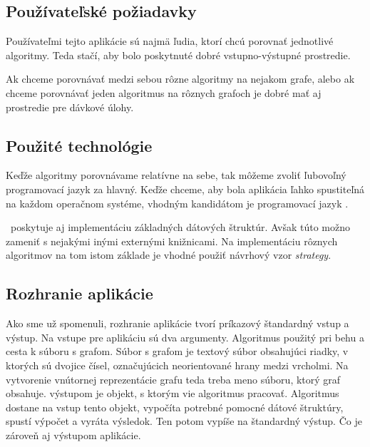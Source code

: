 
\subsection{Používateľské požiadavky}

Používateľmi tejto aplikácie sú najmä ľudia, ktorí chcú porovnať jednotlivé 
algoritmy. Teda stačí, aby bolo poskytnuté dobré vstupno-výstupné prostredie.

Ak chceme porovnávať medzi sebou rôzne algoritmy na nejakom grafe, alebo ak 
chceme porovnávať jeden algoritmus na rôznych grafoch je dobré mať aj 
prostredie pre dávkové úlohy.


\subsection{Použité technológie}

Keďže algoritmy porovnávame relatívne na sebe, tak môžeme zvoliť ľubovoľný 
programovací jazyk za hlavný. Keďže chceme, aby bola aplikácia ľahko 
spustiteľná na každom operačnom systéme, vhodným kandidátom je programovací 
jazyk \Java .

\Java\ poskytuje aj implementáciu základných dátových štruktúr. Avšak túto možno 
zameniť s nejakými inými externými knižnicami. Na implementáciu rôznych 
algoritmov na tom istom základe je vhodné použiť návrhový vzor \emph{strategy}.


\subsection{Rozhranie aplikácie}

Ako sme už spomenuli, rozhranie aplikácie tvorí príkazový štandardný vstup a 
výstup. Na vstupe pre aplikáciu sú dva argumenty. Algoritmus použitý pri behu a 
cesta k súboru s grafom. Súbor s grafom je textový súbor obsahujúci riadky, 
v ktorých sú dvojice čísel, označujúcich neorientované hrany medzi vrcholmi. 
Na vytvorenie vnútornej reprezentácie grafu teda treba meno súboru, ktorý graf 
obsahuje. výstupom je objekt, s ktorým vie algoritmus pracovať. Algoritmus 
dostane na vstup tento objekt, vypočíta potrebné pomocné dátové štruktúry, 
spustí výpočet a vyráta výsledok. Ten potom vypíše na štandardný výstup. Čo je 
zároveň aj výstupom aplikácie.

